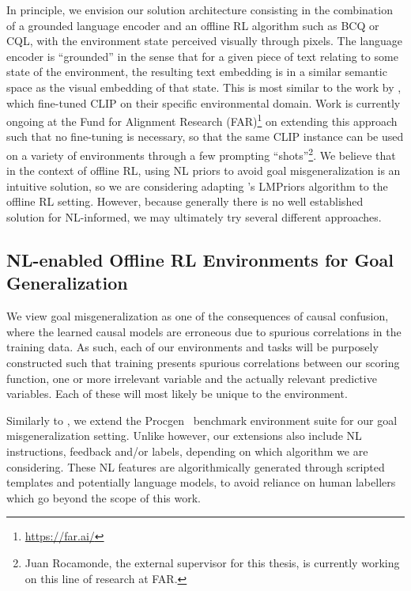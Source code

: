 \documentclass[../thesis-proposal/main.tex]{subfiles}
\begin{document}
In principle, we envision our solution architecture consisting in the combination of a grounded
language encoder and an offline RL algorithm such as BCQ or CQL, with the environment state
perceived visually through pixels. The language encoder is ``grounded'' in the sense that for
a given piece of text relating to some state of the environment, the resulting text embedding is in
a similar semantic space as the visual embedding of that state. This is most similar to the work by
\citet{fan_minedojo_2022}, which fine-tuned CLIP \citep{radford_learning_2021} on their specific
environmental domain. Work is currently ongoing at the Fund for Alignment Research
(FAR)\footnote{\href{https://far.ai/}{https://far.ai/}} on extending this approach such that no
fine-tuning is necessary, so that the same CLIP instance can be used on a variety of environments
through a few prompting ``shots''\footnote{Juan Rocamonde, the external supervisor for this thesis,
is currently working on this line of research at FAR.}. We believe that in the context of offline
RL, using NL priors to avoid goal misgeneralization is an intuitive solution, so we are considering
adapting \citet{choi_lmpriors_2022}'s LMPriors algorithm to the offline RL setting. However, because
generally there is no well established solution for NL-informed, we may ultimately try several
different approaches.

\subsection{NL-enabled Offline RL Environments for Goal Generalization}

We view goal misgeneralization as one of the consequences of causal confusion, where the learned
causal models are erroneous due to spurious correlations in the training data. As such, each of our
environments and tasks will be purposely constructed such that training presents spurious
correlations between our scoring function, one or more irrelevant variable and the actually relevant
predictive variables. Each of these will most likely be unique to the environment.

Similarly to \citet{langosco_goal_2022}, we extend the Procgen~\citep{cobbe_leveraging_2020}
benchmark environment suite for our goal misgeneralization setting. Unlike
\citet{langosco_goal_2022} however, our extensions also include NL instructions, feedback and/or
labels, depending on which algorithm we are considering. These NL features are algorithmically
generated through scripted templates and potentially language models, to avoid reliance on human
labellers which go beyond the scope of this work.
\end{document}
